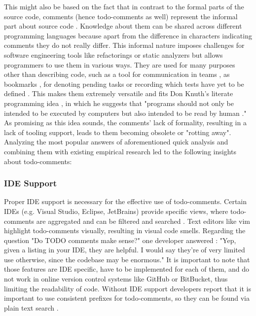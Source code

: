This might also be based on the fact that in contrast to the formal parts of the source code, comments (hence todo-comments as well) represent the informal part about source code \cite{ying_source_2005, nie_framework_2019, sridhara_automatically_2016, storey_todo_2008}.
Knowledge about them can be shared across different programming languages because apart from the difference in characters indicating comments they do not really differ.
This informal nature imposes challenges for software engineering tools like refactorings or static analyzers but allows programmers to use them in various ways.
They are used for many purposes other than describing code, such as a tool for communication in teams \cite{ying_source_2005}, as bookmarks \cite{storey_how_2009}, for denoting pending tasks \cite{sridhara_automatically_2016} or recording which tests have yet to be defined \cite{storey_todo_2008}.
This makes them extremely versatile and fits Don Knuth's literate programming idea \cite{knuth_literate_1984}, in which he suggests that "programs should not only be intended to be executed by computers but also intended to be read by human \cite{ying_source_2005}."
As promising as this idea sounds, the comments' lack of formality, resulting in a lack of tooling support, leads to them becoming obsolete or "rotting away".
Analyzing the most popular answers of aforementioned quick analysis \cite{karacic_todo_2015, snoop_does_2016, tackabury_how_2019, alecxe_how_2018, squires_use_2012} and combining them with existing empirical \cite{ying_source_2005, nie_framework_2019, storey_how_2009} research led to the following insights about todo-comments:

\subsubsection{IDE Support}
Proper IDE support is necessary for the effective use of todo-comments.
Certain IDEs (e.g. Visual Studio, Eclipse, JetBrains) provide specific views, where todo-comments are aggregated and can be filtered and searched \cite{storey_how_2009}.
Text editors like vim highlight todo-comments visually, resulting in visual code smells.
Regarding the question "Do TODO comments make sense?" one developer answered \cite{karacic_todo_2015}: "Yep, given a listing in your IDE, they are helpful. I would say they're of very limited use otherwise, since the codebase may be enormous."
It is important to note that those features are IDE specific, have to be implemented for each of them, and do not work in online version control systems like GitHub or BitBucket, thus limiting the readability of code.
Without IDE support developers report that it is important to use consistent prefixes for todo-comments, so they can be found via plain text search \cite{karacic_todo_2015}.

